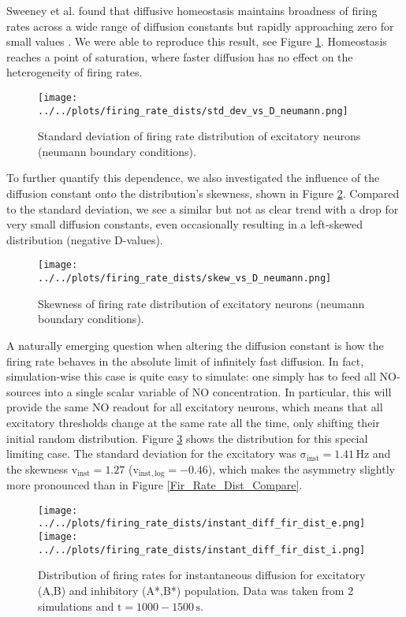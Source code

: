 \documentclass[10pt,a4paper]{article}
\begin{document}
Sweeney et al. found that diffusive homeostasis maintains broadness of firing rates across a wide range of diffusion constants but rapidly approaching zero for small values \cite[p. 6]{Sweeney_Paper}. We were able to reproduce this result, see Figure \ref{Fir_Rate_Dist_Width_vs_D}. Homeostasis reaches a point of saturation, where faster diffusion has no effect on the heterogeneity of firing rates. 
\begin{figure}
\texttt{[image: ../../plots/firing\_rate\_dists/std\_dev\_vs\_D\_neumann.png]}
\caption{Standard deviation of firing rate distribution of excitatory neurons (neumann boundary conditions).}
\label{Fir_Rate_Dist_Width_vs_D}
\end{figure}
To further quantify this dependence, we also investigated the influence of the diffusion constant onto the distribution's skewness, shown in Figure \ref{Fir_Rate_Dist_Skew_vs_D}. Compared to the standard deviation, we see a similar but not as clear trend with a drop for very small diffusion constants, even occasionally resulting in a left-skewed distribution (negative D-values).
\begin{figure}
\texttt{[image: ../../plots/firing\_rate\_dists/skew\_vs\_D\_neumann.png]}
\caption{Skewness of firing rate distribution of excitatory neurons (neumann boundary conditions).}
\label{Fir_Rate_Dist_Skew_vs_D}
\end{figure}
A naturally emerging question when altering the diffusion constant is how the firing rate behaves in the absolute limit of infinitely fast diffusion. In fact, simulation-wise this case is quite easy to simulate: one simply has  to feed all NO-sources into a single scalar variable of NO concentration. In particular, this will provide the same NO readout for all excitatory neurons, which means that all excitatory thresholds change at the same rate all the time, only shifting their initial random distribution. Figure \ref{Fir_Rate_Dist_Instant_compare} shows the distribution for this special limiting case. The standard deviation for the excitatory was $\mathrm{\sigma_{inst} = 1.41\, Hz}$ and the skewness $\mathrm{v_{inst} = 1.27}$ ($\mathrm{v_{inst,log} = -0.46}$), which makes the asymmetry slightly more pronounced than in Figure \ref{Fir_Rate_Dist_Compare}.  
\begin{figure}
\texttt{[image: ../../plots/firing\_rate\_dists/instant\_diff\_fir\_dist\_e.png]}
\texttt{[image: ../../plots/firing\_rate\_dists/instant\_diff\_fir\_dist\_i.png]}
\caption{Distribution of firing rates for instantaneous diffusion for excitatory (A,B) and inhibitory (A*,B*) population. Data was taken from 2 simulations and $\mathrm{t=1000-1500\,s}$.}
\label{Fir_Rate_Dist_Instant_compare}
\end{figure}
\end{document}
